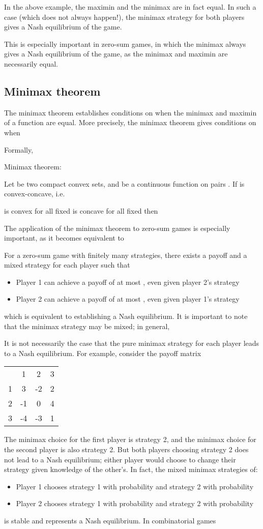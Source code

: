 \documentclass[a4paper,12pt]{article}
\begin{document}
In the above example, the maximin and the minimax are in fact equal. In such a case (which does not always happen!), the minimax strategy for both players gives a Nash equilibrium of the game.

This is especially important in zero-sum games, in which the minimax always gives a Nash equilibrium of the game, as the minimax and maximin are necessarily equal.
\subsection{Minimax theorem}
The minimax theorem establishes conditions on when the minimax and maximin of a function are equal. More precisely, the minimax theorem gives conditions on when


Formally,

Minimax theorem:

Let  be two compact convex sets, and  be a continuous function on pairs . If  is convex-concave, i.e.

 is convex for all fixed 
 is concave for all fixed 
then

The application of the minimax theorem to zero-sum games is especially important, as it becomes equivalent to

For a zero-sum game with finitely many strategies, there exists a payoff  and a mixed strategy for each player such that
\begin{itemize}
\item Player 1 can achieve a payoff of at most , even given player 2's strategy
\item Player 2 can achieve a payoff of at most , even given player 1's strategy
\end{itemize}
which is equivalent to establishing a Nash equilibrium.
It is important to note that the minimax strategy may be mixed; in general,

It is not necessarily the case that the pure minimax strategy for each player leads to a Nash equilibrium.
For example, consider the payoff matrix
\begin{tabular}{|c|c|c|c|}
   & 1	 & 2	& 3   \\
1  &	3&	-2 &	2 \\
2  &	-1&	0 &	4 \\
3  &	-4&	-3 &	1 \\
\end{tabular}
The minimax choice for the first player is strategy 2, and the minimax choice for the second player is also strategy 2. But both players choosing strategy 2 does not lead to a Nash equilibrium; either player would choose to change their strategy given knowledge of the other's. In fact, the mixed minimax strategies of:
\begin{itemize}
\item Player 1 chooses strategy 1 with probability  and strategy 2 with probability 
\item Player 2 chooses strategy 1 with probability  and strategy 2 with probability 
\end{itemize}
is stable and represents a Nash equilibrium.
In combinatorial games
\end{document}
